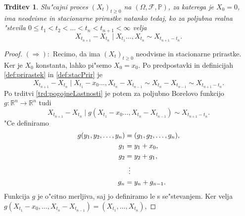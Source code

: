 \documentclass[12pt, a4paper, reqno]{amsart}
\theoremstyle{definition}
\theoremstyle{plain}
\newtheorem{trditev}[definicija]{Trditev}
\newcommand{\R}{\mathbb{R}}
\newcommand{\F}{\mathcal{F}}
\newcommand{\1}{\mathds{1}}
\newcommand*{\refPriloga}[1]{%
  \begingroup
    \hypersetup{
      linkcolor=red,
      linkbordercolor=red,
    }%
    \ref{#1}%
  \endgroup
}
\begin{document}
        \pagebreak
        \begin{trditev}
            Slu"cajni proces $(X_t)_{t\geq0}$ na $(\Omega, \F, \mathbb{P})$, za katerega je $X_0 = 0$, ima
            neodvisne in stacionarne prirastke natanko tedaj, ko za poljubna realna "stevila
            $0\leq t_1 < t_2 < \ldots < t_n < t_{n+1} < \infty$ velja 
            \begin{equation}
                X_{t_{n+1}} - X_{t_n}\mid X_{t_1} \dots, X_{t_n} \sim X_{t_{n+1} - t_n}.
                \label{eq:neodvisnostStacionarnostPrirastov}
            \end{equation}
            \label{trd:neodvisnostStacionarnostPrirastov}
        \end{trditev}

        \begin{proof}
            $(\Rightarrow):$ Recimo, da ima $(X_t)_{t\geq0}$ neodvisne in stacionarne prirastke. Ker je 
            $X_0$ konstanta, lahko pi"semo $X_0 = x_0$. Po predpostavki in definicijah \refPriloga{def:prirastek} in 
            \refPriloga{def:stacPrir} je 
            \begin{equation*}
                X_{t_{n+1}} - X_{t_n}\mid X_{t_1} - x_0 \dots, X_{t_n} - X_{t_{n-1}}\sim X_{t_n} - X_{t_{n-1}} \sim X_{t_{n+1} - t_n}.
            \end{equation*}
            Po trditvi \refPriloga{trd:pogojneLastnosti} je potem za poljubno Borelovo funkcijo $g:\R^{n}\to \R^{n}$
            tudi 
            \begin{equation*}
                X_{t_{n+1}} - X_{t_n}\mid g(X_{t_1} - x_0 \dots, X_{t_n} - X_{t_{n-1}}) \sim X_{t_{n+1} - t_n}.
            \end{equation*}
            "Ce definiramo 
            \begin{align*}
                g(y_1, y_2, \dots, y_n) &= (g_1, g_2, \dots, g_n),\\
                                    g_1 &= y_1 + x_0, \\
                                    g_2 &= y_2 + g_1, \\
                                    &\mathrel{\makebox[\widthof{=}]{\vdots}} \\
                                    g_n &= y_n + g_{n-1}.
            \end{align*}
            Funkcija $g$ je o"citno merljiva, saj jo definiramo le s se"stevanjem. Ker velja
            $g(X_{t_1} - x_0, \dots, X_{t_n} - X_{t_{n-1}}) = (X_{t_1}, \dots, X_{t_n})$, 

\end{proof}
\end{document}
